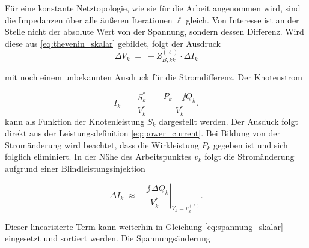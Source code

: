 Für eine konstante Netztopologie, wie sie für die Arbeit angenommen wird, sind die Impedanzen über alle äußeren Iterationen $\ell$ gleich.
Von Interesse ist an der Stelle nicht der absolute Wert von der Spannung, sondern dessen Differenz.
Wird diese aus \eqref{eq:thevenin_skalar} gebildet, folgt der Ausdruck
\begin{equation}
	\Delta V_k \;=\; -Z^{(\ell)}_{B,kk}\cdot\Delta I_k
	\label{eq:spannung_skalar}
\end{equation}

mit noch einem unbekannten Ausdruck für die Stromdifferenz.
Der Knotenstrom 


\begin{equation}
	I_k \;=\; \frac{S_k^*}{V_k^*} \;=\; \frac{P_k - \jj Q_k}{V_k^*}.
	\label{eq:strom_skalar}
\end{equation}
kann als Funktion der Knotenleistung $S_{k}$ dargestellt werden. Der  Ausduck folgt direkt aus der Leistungsdefinition \eqref{eq:power_current}.
Bei Bildung von der Stromänderung wird beachtet, dass die Wirkleistung $P_{k}$ gegeben ist und sich folglich eliminiert. In der Nähe des Arbeitspunktes $v_{k}$ folgt die Stromänderung aufgrund einer Blindleistungsinjektion

\begin{equation}
	\Delta I_k \;\approx\; \left.\frac{-\jj\,\Delta Q_k}{V_k^*}\right|_{V_k = v^{(\ell)}_k}.
	\label{eq:strom_linear}
\end{equation}

Dieser linearisierte Term kann weiterhin in Gleichung \eqref{eq:spannung_skalar} eingesetzt und sortiert werden. 
Die Spannungsänderung 

